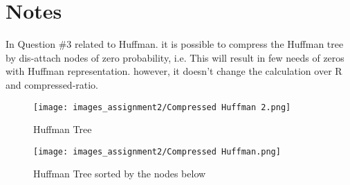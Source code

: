 \documentclass[letterpaper, 12pt]{article}
\begin{document}
\newpage
\section{Notes}
In Question \#3 related to Huffman.
it is possible to compress the Huffman tree by dis-attach nodes of zero probability, i.e. This will result in few needs of zeros with Huffman representation. however, it doesn't change the calculation over R and compressed-ratio.
\begin{figure}[htbp]
        \centering
        \texttt{[image: images\_assignment2/Compressed Huffman 2.png]}
        \caption{Huffman Tree}
        \label{fig:enter-label}
    \end{figure}
\begin{figure}[htbp]

    \centering
    \texttt{[image: images\_assignment2/Compressed Huffman.png]}
    \caption{Huffman Tree sorted by the nodes below }
    \label{fig:enter-label}
\end{figure}
\end{document}

